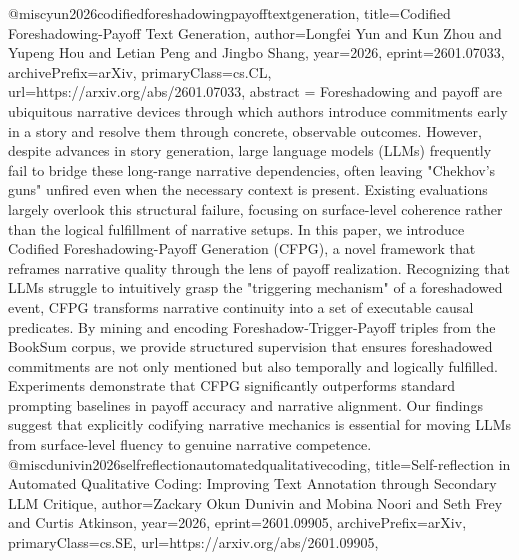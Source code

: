 {}@misc{yun2026codifiedforeshadowingpayofftextgeneration,
      title={Codified Foreshadowing-Payoff Text Generation}, 
      author={Longfei Yun and Kun Zhou and Yupeng Hou and Letian Peng and Jingbo Shang},
      year={2026},
      eprint={2601.07033},
      archivePrefix={arXiv},
      primaryClass={cs.CL},
      url={https://arxiv.org/abs/2601.07033},
      abstract = {Foreshadowing and payoff are ubiquitous narrative devices through which authors introduce commitments early in a story and resolve them through concrete, observable outcomes. However, despite advances in story generation, large language models (LLMs) frequently fail to bridge these long-range narrative dependencies, often leaving "Chekhov's guns" unfired even when the necessary context is present. Existing evaluations largely overlook this structural failure, focusing on surface-level coherence rather than the logical fulfillment of narrative setups. In this paper, we introduce Codified Foreshadowing-Payoff Generation (CFPG), a novel framework that reframes narrative quality through the lens of payoff realization. Recognizing that LLMs struggle to intuitively grasp the "triggering mechanism" of a foreshadowed event, CFPG transforms narrative continuity into a set of executable causal predicates. By mining and encoding Foreshadow-Trigger-Payoff triples from the BookSum corpus, we provide structured supervision that ensures foreshadowed commitments are not only mentioned but also temporally and logically fulfilled. Experiments demonstrate that CFPG significantly outperforms standard prompting baselines in payoff accuracy and narrative alignment. Our findings suggest that explicitly codifying narrative mechanics is essential for moving LLMs from surface-level fluency to genuine narrative competence.}
}@misc{dunivin2026selfreflectionautomatedqualitativecoding,
      title={Self-reflection in Automated Qualitative Coding: Improving Text Annotation through Secondary LLM Critique}, 
      author={Zackary Okun Dunivin and Mobina Noori and Seth Frey and Curtis Atkinson},
      year={2026},
      eprint={2601.09905},
      archivePrefix={arXiv},
      primaryClass={cs.SE},
      url={https://arxiv.org/abs/2601.09905},
}
